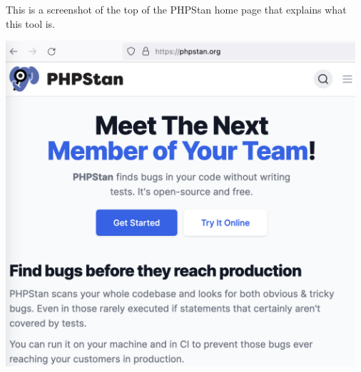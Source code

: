 
This is a screenshot of the top of the PHPStan home page that explains what this tool is.

\begin{center}
    \includegraphics[width=35em]{phpstan-home}
\end{center}

\pagebreak
